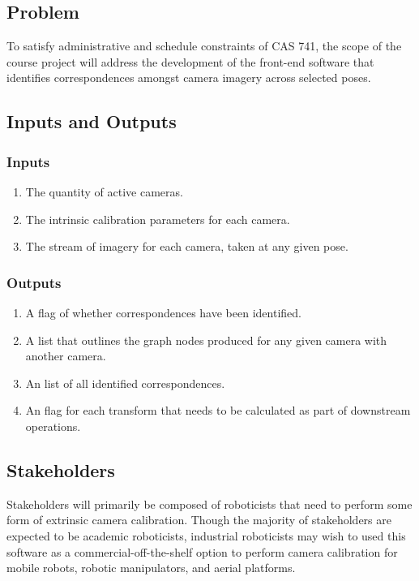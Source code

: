 \documentclass{article}
\begin{document}
\subsection{Problem}
To satisfy administrative and schedule constraints of CAS 741, the scope of the 
course project will 
address the development of the front-end software that identifies 
correspondences amongst camera imagery across selected poses.

\subsection{Inputs and Outputs}
\subsubsection{Inputs}
\begin{enumerate}
    \item The quantity of active cameras.
    \item The intrinsic calibration parameters for each camera.
    \item The stream of imagery for each camera, taken at any given pose.
\end{enumerate}  

\subsubsection{Outputs}
\begin{enumerate}
    \item A flag of whether correspondences have been identified.
    \item A list that outlines the graph nodes produced for any given camera 
    with another camera.

    \item An list of all identified correspondences.
    \item An flag for each transform that needs to be calculated as part 
    of downstream operations.
\end{enumerate}  

\subsection{Stakeholders}
Stakeholders will primarily be composed of roboticists that need to perform some 
form of extrinsic camera calibration. 
Though the majority of stakeholders are expected to be academic roboticists, 
industrial roboticists may wish to used this software as a 
commercial-off-the-shelf option to perform camera calibration for mobile 
robots, robotic manipulators, and aerial platforms.
\end{document}
